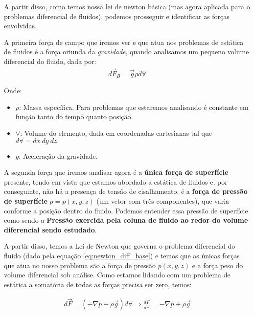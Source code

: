 \documentclass{article}
\begin{document}
            A partir disso, como temos nossa lei de newton básica (mas agora aplicada para o problemas diferencial de fluidos), podemos prosseguir e identificar as forças envolvidas.

            A primeira força de campo que iremos ver e que atua nos problemas de estática de fluidos é a força oriunda da \emph{gravidade}, quando analisamos um pequeno volume diferencial do fluido, dada por:
            \begin{align}
                d\vec{F}_B = \vec{g}\rho d \forall \label{eq:forca_peso}
            \end{align}

            Onde:
            \begin{itemize}
                \item $\rho$: Massa específica. Para problemas que estaremos analisando é constante em função tanto do tempo quanto posição.
                \item $\forall$: Volume do elemento, dada em coordenadas cartesianas tal que $d\forall = dx \ dy \ dz$
                \item $g$: Aceleração da gravidade.
            \end{itemize}

            A segunda força que iremos analisar agora é a \textbf{única força de superfície} presente, tendo em vista que estamos abordado a estática de fluidos e, por conseguinte, não há a presença
            de tensão de cisalhamento, é a \textbf{força de pressão de superfície} $p = p(x, y, z)$ (um vetor com três componentes), que varia conforme a posição dentro do fluido. Podemos entender essa pressão de superfície como sendo a 
            \textbf{Pressão exercida pela coluna de fluido ao redor do volume diferencial sendo estudado}.

            A partir disso, temos a Lei de Newton que governa o problema diferencial do fluido (dado pela equação \ref{eq:newton_diff_base}) e temos que as únicas forças que atua no nosso problema são a
            força de pressão $p(x, y, z)$ e a força peso do volume diferencial sob análise. Como estamos lidando com um problema de estática a somatória de todas as forças precisa ser zero, temos:

            \begin{align}
                d\vec{F} = (-\nabla p + \rho \vec{g}) d\forall \Rightarrow \frac{d\vec{F}}{d\forall} = -\nabla p + \rho \vec g \label{eq:newton_estatica_de_fluidos}
            \end{align}
\end{document}
